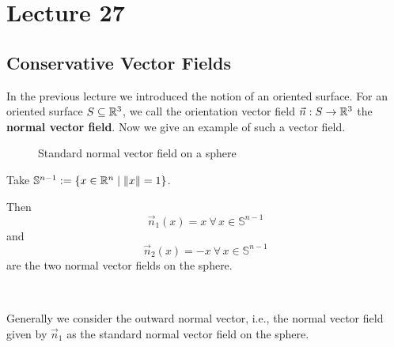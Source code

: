 \documentclass[../Analysis-3.tex]{subfiles}
\begin{document}
\chapter*{Lecture 27} %
\setcounter{chapter}{27} %
\setcounter{section}{0}
\setcounter{equation}{0}
\setcounter{figure}{0}


\section{Conservative Vector Fields}

In the previous lecture we introduced the notion of an oriented surface. For an oriented surface $S \subseteq \mathbb{R}^3$, we call the orientation vector field $\vec{n} : S \to \mathbb{R}^3$ the \textbf{normal vector field}. Now we give an example of such a vector field.

\begin{Eg}{}{}
  \begin{figure}
    \centering
    \caption{Standard normal vector field on a sphere}\label{fig1:27}
  \end{figure}
  Take $\mathbb{S}^{n-1} := \{ x \in \mathbb{R}^n \mid \norm{x} = 1 \}$.

  Then
  \[ \vec{n}_1(x) = x \ \forall \, x \in \mathbb{S}^{n-1} \] and
  \[ \vec{n}_2(x) = -x \ \forall \, x \in \mathbb{S}^{n-1} \]
  are the two normal vector fields on the sphere.

  \

  Generally we consider the outward normal vector, i.e., the normal vector field given by $\vec{n}_1$ as the standard normal vector field on the sphere.
\end{Eg}
\end{document}

